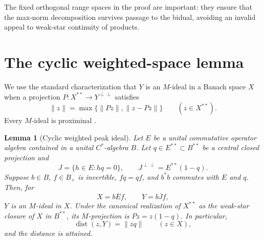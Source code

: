 \documentclass[11pt]{article}
\newtheorem{lemma}{Lemma}
\begin{document}
The fixed orthogonal range spaces in the proof are important: they ensure
that the max-norm decomposition survives passage to the bidual, avoiding an
invalid appeal to weak-star continuity of products.

\section{The cyclic weighted-space lemma}

We use the standard characterization that $Y$ is an $M$-ideal in a Banach
space $X$ when a projection $P:X^{**}\to Y^{\perp\perp}$ satisfies
\[
 \|z\|=\max\{\|Pz\|,\|z-Pz\|\}\qquad(z\in X^{**}).
\]
Every $M$-ideal is proximinal \cite{HWW}.

\begin{lemma}[Cyclic weighted peak ideal]\label{lem:cyclic}
Let $E$ be a unital commutative operator algebra contained in a unital
$C^*$-algebra $B$.  Let $q\in E^{**}\subset B^{**}$ be a central closed
projection and
\[
 J=\{h\in E:hq=0\},\qquad J^{\perp\perp}=E^{**}(1-q).
\]
Suppose $b\in B$, $f\in B_+$ is invertible, $fq=qf$, and $b^*b$ commutes
with $E$ and $q$.  Then, for
\[
 X=\overline{bEf},\qquad Y=\overline{bJf},
\]
$Y$ is an $M$-ideal in $X$.  Under the canonical realization of $X^{**}$ as
the weak-star closure of $X$ in $B^{**}$, its $M$-projection is
$Pz=z(1-q)$.  In particular,
\begin{equation}\label{eq:distance}
 \operatorname{dist}(z,Y)=\|zq\|\qquad(z\in X),
\end{equation}
and the distance is attained.
\end{lemma}
\end{document}
